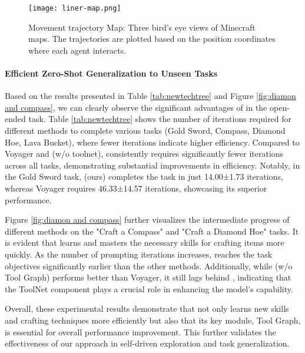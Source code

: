 \vskip -0.2in
\begin{figure}[H]
\vskip 0.2in
\begin{center}
\centerline{\texttt{[image: liner-map.png]}}
\caption{Movement trajectory Map: Three bird’s eye views of Minecraft maps. The trajectories are plotted based on the position coordinates where each agent interacts.}
\label{fig:linermap}
\end{center}
\vskip -0.3in
\end{figure}



\paragraph{Efficient Zero-Shot Generalization to Unseen Tasks} Based on the results presented in Table \ref{tab:newtechtree} and Figure \ref{fig:diamon and compass}, we can clearly observe the significant advantages of {\ours} in the open-ended task. Table \ref{tab:newtechtree} shows the number of iterations required for different methods to complete various tasks (Gold Sword, Compass, Diamond Hoe, Lava Bucket), where fewer iterations indicate higher efficiency. Compared to Voyager and {\ours} (w/o toolnet), {\ours} consistently requires significantly fewer iterations across all tasks, demonstrating substantial improvements in efficiency. Notably, in the Gold Sword task, {\ours} (ours) completes the task in just 14.00±1.73 iterations, whereas Voyager requires 46.33±14.57 iterations, showcasing its superior performance.

Figure \ref{fig:diamon and compass} further visualizes the intermediate progress of different methods on the "Craft a Compass" and "Craft a Diamond Hoe" tasks. It is evident that {\ours} learns and masters the necessary skills for crafting items more quickly. As the number of prompting iterations increases, {\ours} reaches the task objectives significantly earlier than the other methods. Additionally, while {\ours}(w/o Tool Graph) performs better than Voyager, it still lags behind {\ours}, indicating that the ToolNet component plays a crucial role in enhancing the model's capability.

Overall, these experimental results demonstrate that {\ours} not only learns new skills and crafting techniques more efficiently but also that its key module, Tool Graph, is essential for overall performance improvement. This further validates the effectiveness of our approach in self-driven exploration and task generalization.


